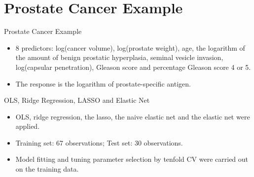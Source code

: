 
\section{Prostate Cancer Example}

    \begin{frame}{Prostate Cancer Example}
        \begin{itemize}
            \item 8 predictors: log(cancer volume), log(prostate weight), age, the logarithm of the amount of benign prostatic hyperplasia, seminal vesicle invasion, log(capsular penetration), Gleason score and percentage Gleason score 4 or 5.
            \item The response is the logarithm of prostate-specific antigen.
        \end{itemize}
        
    \end{frame}

    \begin{frame}{OLS, Ridge Regression, LASSO and Elastic Net}
        \begin{itemize}
            \item OLS, ridge regression, the lasso, the naive elastic net and the elastic net were applied.
            \item Training set: 67 observations; Test set: 30 observations.
            \item Model fitting and tuning parameter selection by tenfold CV were carried out on the training data.
        \end{itemize}
    \end{frame}

